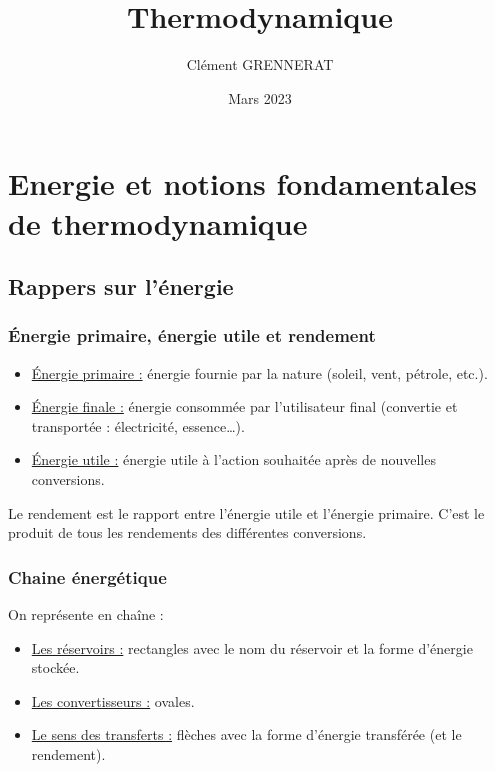 \documentclass[13pt, twoside, a4paper, french]{report}
\newcommand*{\getSubject}{Thermodynamique}
\begin{document}
    \title{\getSubject}
    \author{Clément GRENNERAT}
    \date{Mars 2023}
    \pagestyle{non-chapter-style}


    \chapter{Energie et notions fondamentales de thermodynamique}\label{ch:energie-et-notions-fondamentales-de-thermodynamique}


        \section{Rappers sur l'énergie}\label{sec:rappers-sur-l'energie}

            \subsection{Énergie primaire, énergie utile et rendement}\label{subsec:energie-primaire-energie-utile-et-rendement}

                \begin{itemize}
                    \item \underline{Énergie primaire :} énergie fournie par la nature (soleil, vent, pétrole, etc.).
                    \item \underline{Énergie finale :} énergie consommée par l'utilisateur final (convertie et transportée : électricité, essence\ldots).
                    \item \underline{Énergie utile :} énergie utile à l'action souhaitée après de nouvelles conversions.
                \end{itemize}
                Le rendement est le rapport entre l'énergie utile et l'énergie primaire.
                C'est le produit de tous les rendements des différentes conversions.

            \subsection{Chaine énergétique}\label{subsec:chaine-energetique}

                On représente en chaîne :
                \begin{itemize}
                    \item \underline{Les réservoirs :} rectangles avec le nom du réservoir et la forme d'énergie stockée.
                    \item \underline{Les convertisseurs :} ovales.
                    \item \underline{Le sens des transferts :} flèches avec la forme d'énergie transférée (et le rendement).
                \end{itemize}
\end{document}
